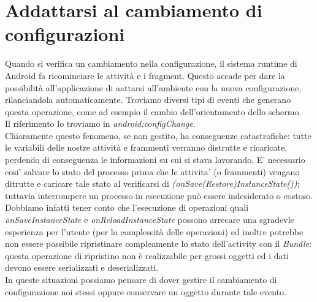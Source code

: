 %

% 


\chapter{Addattarsi al cambiamento di configurazioni}
Quando si verifica un cambiamento nella configurazione, il sistema runtime di Android fa ricominciare le attività e i fragment. Questo accade per dare la possibilità all'applicazione di aattarsi all'ambiente con la nuova configurazione, rilanciandola automaticamente. Troviamo diversi tipi di eventi che generano questa operazione, come ad esempio il cambio dell'orientamento dello schermo.\\
Il riferimento lo troviamo in \textit{android:configChange}.\\
Chiaramente questo fenomeno, se non gestito, ha conseguenze catastrofiche: tutte le variabili delle nostre attività e frammenti verranno distrutte e ricaricate, perdendo di conseguenza le informazioni su cui si stava lavorando. E' necessario cosi' salvare lo stato del processo prima che le attivita' (o frammenti) vengano ditrutte e caricare tale stato al verificarsi di \textit{(onSave(Restore)InstanceState())}; tuttavia interrompere un processo in esecuzione può essere indesiderato o costoso.\\
Dobbiamo infatti tener conto che l'esecuzione di operazioni quali \textit{onSaveInstanceState} e \textit{onReloadInstanceState} possono arrecare una sgradevle esperienza per l'utente (per la complessità delle operazioni) ed inoltre potrebbe non essere possibile ripristinare compleamente lo stato dell'activity con il \textit{Bundle}: questa operazione di ripristino non è realizzabile per grossi oggetti ed i dati devono essere serializzati e deserializzati.\\
In queste situazioni possiamo pensare di dover gestire il cambiamento di configurazione noi stessi oppure conservare un oggetto durante tale evento.
